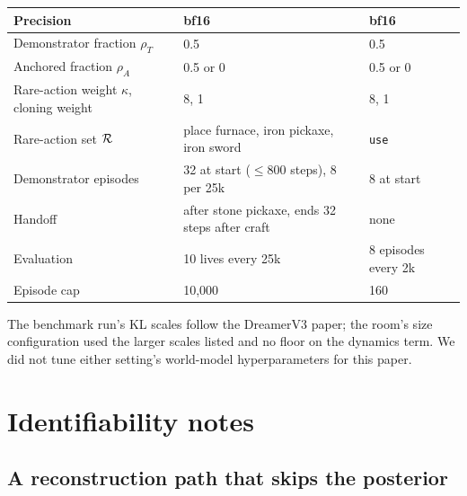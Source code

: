 \begin{table}[h]
\begin{tabular}{l l l}
    Precision & bf16 & bf16 \\
    \midrule
    Demonstrator fraction $\rho_T$ & 0.5 & 0.5 \\
    Anchored fraction $\rho_A$ & 0.5 or 0 & 0.5 or 0 \\
    Rare-action weight $\kappa$, cloning weight & 8, 1 & 8, 1 \\
    Rare-action set $\mathcal{R}$ & place furnace, iron pickaxe, iron sword & \texttt{use} \\
    Demonstrator episodes & 32 at start ($\le$800 steps), 8 per 25k & 8 at start \\
    Handoff & after stone pickaxe, ends 32 steps after craft & none \\
    Evaluation & 10 lives every 25k & 8 episodes every 2k \\
    Episode cap & 10{,}000 & 160 \\
    \bottomrule
  \end{tabular}
\end{table}

The benchmark run's KL scales follow the DreamerV3 paper; the room's size configuration used the larger scales listed and no floor on the dynamics term.
We did not tune either setting's world-model hyperparameters for this paper.

\section{Identifiability notes}
\label{app:identifiability}

\subsection{A reconstruction path that skips the posterior}
\label{app:bypass}

